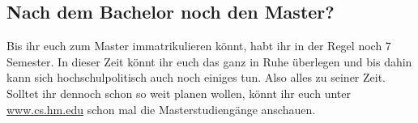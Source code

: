 \subsection{Nach dem Bachelor noch den Master?}
Bis ihr euch zum Master immatrikulieren könnt, habt ihr in der Regel 
noch 7 Semester. In dieser Zeit könnt ihr euch das ganz in Ruhe 
überlegen und bis dahin kann sich hochschulpolitisch auch noch einiges 
tun. Also alles zu seiner Zeit. Solltet ihr dennoch schon so weit planen 
wollen, könnt ihr euch unter \url{www.cs.hm.edu} \arrow {} schon 
mal die Masterstudiengänge anschauen. 